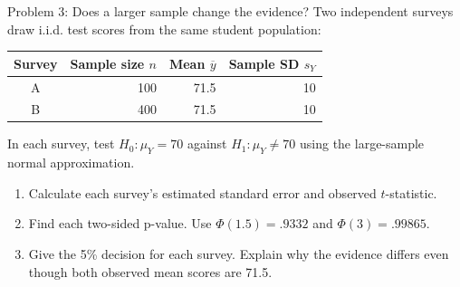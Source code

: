 \documentclass[notes,10pt, aspectratio=169]{beamer}
\begin{document}
\begin{frame}{Problem 3: Does a larger sample change the evidence?}
Two independent surveys draw i.i.d. test scores from the same student population:
\begin{center}
\begin{tabular}{c|rrr}
Survey & Sample size $n$ & Mean $\overline y$ & Sample SD $s_Y$ \\ \hline
A & 100 & 71.5 & 10 \\
B & 400 & 71.5 & 10
\end{tabular}
\end{center}
In each survey, test $H_0:\mu_Y=70$ against $H_1:\mu_Y\ne70$ using the large-sample normal approximation.
\begin{enumerate}
\setlength{\itemsep}{8pt}
\item Calculate each survey's estimated standard error and observed $t$-statistic.
\item Find each two-sided p-value. Use $\Phi(1.5)=.9332$ and $\Phi(3)=.99865$.
\item Give the 5\% decision for each survey. Explain why the evidence differs even though both observed mean scores are 71.5.
\end{enumerate}
\end{frame}
\end{document}
